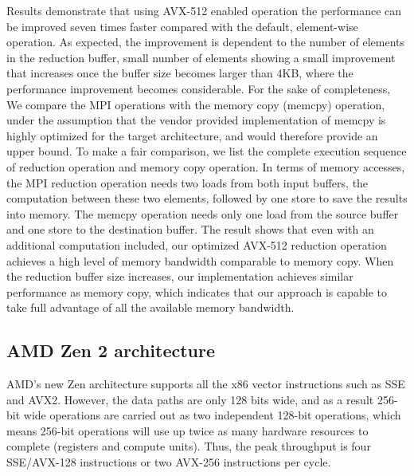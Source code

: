 \documentclass[5p,times,twocolumn]{elsarticle}
\newcommand{\mpi}[0]{\textsc{MPI}\xspace}
\begin{document}
Results demonstrate that using AVX-512 enabled operation the
performance can be improved seven times faster compared with the
default, element-wise operation. As expected, the improvement is dependent to the
number of elements in the reduction buffer, small number of elements showing a small improvement
that increases once the buffer size becomes larger than 4KB, where the performance improvement
becomes considerable. 
%
For the sake of completeness, We compare the MPI
operations with the memory copy (memcpy) operation, under the assumption that
the vendor provided implementation of memcpy is highly optimized for the
target architecture, and would therefore provide an upper bound. To make a fair comparison, we list the
complete execution sequence of reduction operation and memory copy
operation.  In terms of memory accesses, the \mpi reduction operation needs
two loads from both input buffers, the 
computation between these two elements, followed by one store to save the results into
memory. The memcpy operation needs only one load from the source buffer and one store to
the destination buffer. The result shows that even with an additional
computation included, our optimized AVX-512 reduction operation
achieves a high level of memory bandwidth comparable to
memory copy. When the reduction buffer size increases,
our implementation achieves similar performance as
memory copy, which indicates that our approach is capable to take full advantage of all the available memory bandwidth.

\subsection{AMD Zen 2 architecture}
AMD's new Zen architecture supports all the x86 vector instructions such as SSE and AVX2.
However, the data paths are only 128 bits wide, and as a result 256-bit wide operations are carried
out as two independent 128-bit operations, which means 256-bit operations will
use up twice as many hardware resources to complete (registers and compute units). Thus, the peak throughput is four SSE/AVX-128 instructions or two AVX-256 instructions per cycle.
\end{document}
